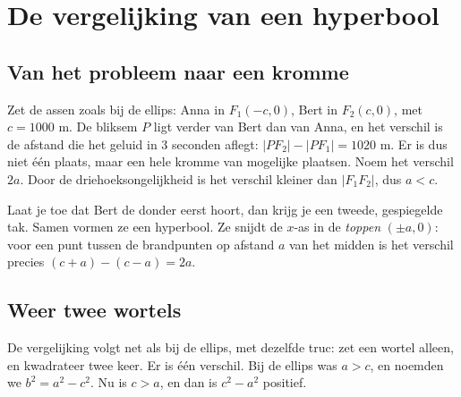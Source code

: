 \section{De vergelijking van een hyperbool}

\subsection{Van het probleem naar een kromme}

Zet de assen zoals bij de ellips: Anna in $F_1(-c, 0)$, Bert in $F_2(c, 0)$, met $c = 1000$ m. De bliksem $P$ ligt verder van Bert dan van Anna, en het verschil is de afstand die het geluid in 3 seconden aflegt: $|PF_2| - |PF_1| = 1020$ m. Er is dus niet één plaats, maar een hele kromme van mogelijke plaatsen. Noem het verschil $2a$. Door de driehoeksongelijkheid is het verschil kleiner dan $|F_1F_2|$, dus $a < c$.

Laat je toe dat Bert de donder eerst hoort, dan krijg je een tweede, gespiegelde tak. Samen vormen ze een hyperbool. Ze snijdt de $x$-as in de \emph{toppen} $(\pm a, 0)$: voor een punt tussen de brandpunten op afstand $a$ van het midden is het verschil precies $(c + a) - (c - a) = 2a$.

\subsection{Weer twee wortels}

De vergelijking volgt net als bij de ellips, met dezelfde truc: zet een wortel alleen, en kwadrateer twee keer. Er is één verschil. Bij de ellips was $a > c$, en noemden we $b^2 = a^2 - c^2$. Nu is $c > a$, en dan is $c^2 - a^2$ positief.

